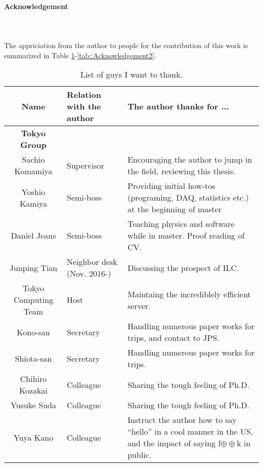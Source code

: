 \paragraph{\LARGE{Acknowledgement}} \mbox{\phantom{aaa}} \\
\mbox{\phantom{aaa}} \\
The appriciation from the author to people for the contribution of this work is summarized in Table \ref{tab::Acknowledgement1}-\ref{tab::Acknowledgement2}.

\begin{table}[h]    
  \centering
  \caption{List of guys I want to thank.}
  \label{tab::Acknowledgement1}
  \begin{tabularx}{\linewidth}{clX}
    \toprule
    Name               & Relation with the author        & The author thanks for ... \\
    \midrule
    \midrule
    \textbf{Tokyo Group} & & \\
    \midrule
    Sachio Komamiya    &   Supervisor                  &  Encouraging the author to jump in the field, reviewing this thesis. \\
    Yoshio Kamiya      &   Semi-boss                   &  Providing initial how-tos (programing, DAQ, statistics etc.) at the beginning of master  \\
    Daniel Jeans       &   Semi-boss                   &  Teaching physics and software while in master. Proof reading of CV.  \\
    Junping Tian       &   Neighbor desk (Nov. 2016-)  &  Discussing the prospect of ILC. \\
    Tokyo Computing Team &  Host       & Maintaing the incrediblely efficient server. \\
    Kono-san           &   Secretary   & Handling numerous paper works for trips, and contact to JPS.  \\
    Shiota-san         &   Secretary   & Handling numerous paper works for trips.  \\
    Chihiro Kozakai    &   Colleague   & Sharing the tough feeling of Ph.D.  \\
    Yusuke Suda        &   Colleague   & Sharing the tough feeling of Ph.D.  \\
    Yuya Kano          &   Colleague   & Instruct the author how to say ``hello'' in a cool manner in the US, and the impact of saying f$\oplus\oplus$k in public.  \\
    \bottomrule
  \end{tabularx}
\end{table}

